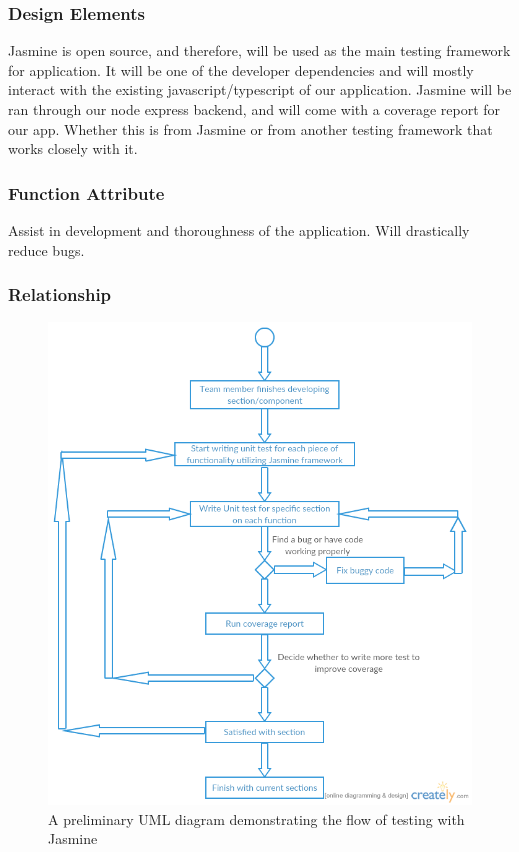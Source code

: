 \documentclass[letterpaper, 10pt, draftclsnofoot, compsoc, onecolumn]{IEEEtran}
\begin{document}
\subsubsection{Design Elements}
{\noindent Jasmine is open source, and therefore, will be used as the main testing framework for application. 
It will be one of the developer dependencies and will mostly interact with the existing javascript/typescript of our application. 
Jasmine will be ran through our node express backend, and will come with a coverage report for our app. Whether this is from Jasmine or 
from another testing framework that works closely with it. \par}

\subsubsection{Function Attribute}
{\noindent Assist in development and thoroughness of the application. Will drastically reduce bugs. \par}

\newpage
\subsubsection{Relationship}
\begin{figure}[ht!]
\centering
\includegraphics[width=120mm]{Testing.png}
\caption{A preliminary UML diagram demonstrating the flow of testing with Jasmine}
\end{figure}
\end{document}
